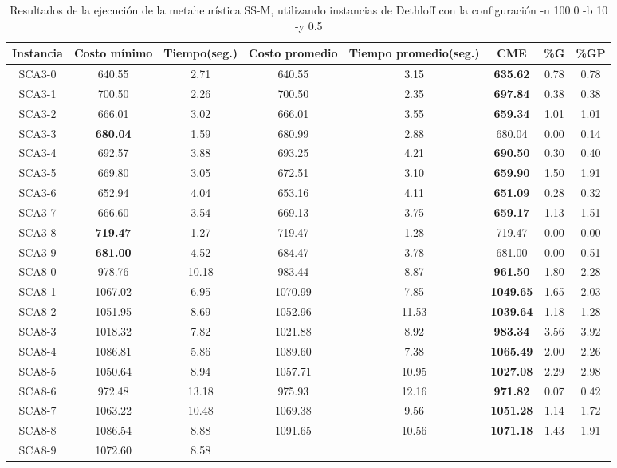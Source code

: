 \begin{table}[h]
\caption{Resultados de la ejecución de la metaheurística SS-M, utilizando instancias de Dethloff con la configuración -n 100.0 -b 10 -y 0.5}
\centering
\small
\begin{tabular}{c c c c c c c c}
\hline\hline
Instancia & Costo mínimo & Tiempo(seg.) & Costo promedio & Tiempo promedio(seg.) & CME & \%G & \%GP \\ [0.5ex]
\hline
SCA3-0 & 640.55 & 2.71 & 
640.55 & 3.15 & \bf{635.62} & 
0.78 & 0.78\\SCA3-1 & 700.50 & 2.26 & 
700.50 & 2.35 & \bf{697.84} & 
0.38 & 0.38\\SCA3-2 & 666.01 & 3.02 & 
666.01 & 3.55 & \bf{659.34} & 
1.01 & 1.01\\SCA3-3 & \bf{680.04} & 1.59 & 
680.99 & 2.88 & 680.04 & 0.00
 & 0.14\\SCA3-4 & 692.57 & 3.88 & 
693.25 & 4.21 & \bf{690.50} & 
0.30 & 0.40\\SCA3-5 & 669.80 & 3.05 & 
672.51 & 3.10 & \bf{659.90} & 
1.50 & 1.91\\SCA3-6 & 652.94 & 4.04 & 
653.16 & 4.11 & \bf{651.09} & 
0.28 & 0.32\\SCA3-7 & 666.60 & 3.54 & 
669.13 & 3.75 & \bf{659.17} & 
1.13 & 1.51\\SCA3-8 & \bf{719.47} & 1.27 & 
719.47 & 1.28 & 719.47 & 0.00
 & 0.00\\
SCA3-9 & \bf{681.00} & 4.52 & 
684.47 & 3.78 & 681.00 & 0.00
 & 0.51\\SCA8-0 & 978.76 & 10.18 & 
983.44 & 8.87 & \bf{961.50} & 
1.80 & 2.28\\SCA8-1 & 1067.02 & 6.95 & 
1070.99 & 7.85 & \bf{1049.65} & 
1.65 & 2.03\\SCA8-2 & 1051.95 & 8.69 & 
1052.96 & 11.53 & \bf{1039.64} & 
1.18 & 1.28\\SCA8-3 & 1018.32 & 7.82 & 
1021.88 & 8.92 & \bf{983.34} & 
3.56 & 3.92\\SCA8-4 & 1086.81 & 5.86 & 
1089.60 & 7.38 & \bf{1065.49} & 
2.00 & 2.26\\SCA8-5 & 1050.64 & 8.94 & 
1057.71 & 10.95 & \bf{1027.08} & 
2.29 & 2.98\\SCA8-6 & 972.48 & 13.18 & 
975.93 & 12.16 & \bf{971.82} & 
0.07 & 0.42\\SCA8-7 & 1063.22 & 10.48 & 
1069.38 & 9.56 & \bf{1051.28} & 
1.14 & 1.72\\SCA8-8 & 1086.54 & 8.88 & 
1091.65 & 10.56 & \bf{1071.18} & 
1.43 & 1.91\\SCA8-9 & 1072.60 & 8.58 & 

\end{tabular}
\end{table}

